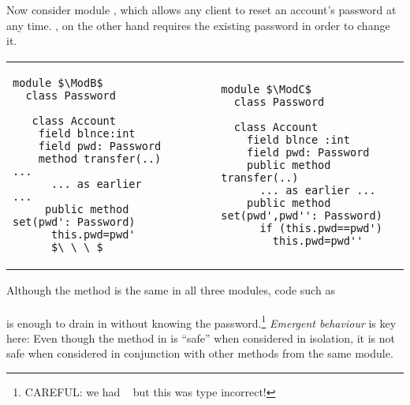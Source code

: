  
Now consider  module \ModB, which allows any client to reset an account's password at any time.  \ModC, on the other hand  requires the existing password in order to change it.
  
  

\begin{tabular}{lll}
\begin{minipage}[b]{0.42\textwidth}
\begin{lstlisting}[mathescape=true, language=Chainmail, frame=lines]
module $\ModB$
  class Password
  
   class Account
    field blnce:int 
    field pwd: Password 
    method transfer(..) ...
      ... as earlier ...
     public method set(pwd': Password)
      this.pwd=pwd'
      $\ \ \ $
\end{lstlisting}
\end{minipage}
&\ \ \  \ \   &%
\begin{minipage}[b]{0.45\textwidth}
\begin{lstlisting}[mathescape=true, language=chainmail, frame=lines]
module $\ModC$
  class Password

  class Account
    field blnce :int 
    field pwd: Password 
    public method transfer(..) 
      ... as earlier ...
    public method set(pwd',pwd'': Password)
      if (this.pwd==pwd') 
        this.pwd=pwd''
\end{lstlisting}
\end{minipage} 
\end{tabular}

\noindent
Although the  method is the same in
all three modules,   %
code  {such as}
\\ 
$\ \strut \hspace{.2in} $  
\\ 
is enough to drain   in \ModB without knowing the password.\footnote{CAREFUL: we had 
$\ \strut \hspace{.01in} $  but this was type incorrect!}
%
\emph{Emergent behaviour} is key here: 
Even though the method  in  \ModB is ``safe'' when considered in isolation, it is not safe when considered in conjunction with other methods from the same module. 
   
